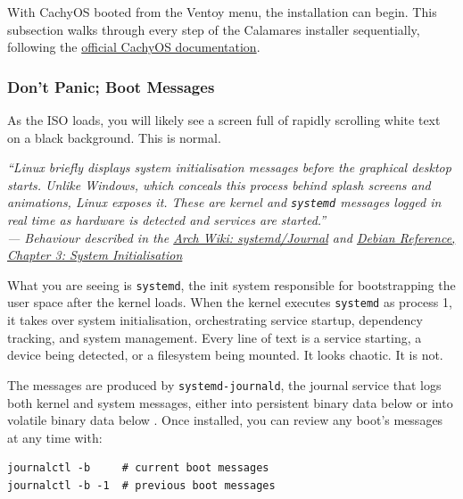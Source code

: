 \documentclass{article}
\newcommand{\code}[1]{\colorbox{codebg}{\texttt{#1}}}
\begin{document}
With CachyOS booted from the Ventoy menu, the installation can begin. This subsection walks through every step of the Calamares installer sequentially, following the
\href{https://wiki.cachyos.org}{official CachyOS documentation}.

\subsubsection{Don't Panic; Boot Messages}

As the ISO loads, you will likely see a screen full of rapidly scrolling white text on a black background. This is normal.  

\begin{mdframed}[linewidth=1.5pt, linecolor=black!50, topline=true, bottomline=true,
  leftline=false, rightline=false, backgroundcolor=black!3]
  \small\itshape
  ``Linux briefly displays system initialisation messages before the graphical desktop
  starts. Unlike Windows, which conceals this process behind splash screens and
  animations, Linux exposes it. These are kernel and \code{systemd} messages logged
  in real time as hardware is detected and services are started.''\\[4pt]
  \normalfont\small --- Behaviour described in the
  \href{https://wiki.archlinux.org/title/Systemd/Journal}{Arch Wiki: systemd/Journal}
  and \href{https://www.debian.org/doc/manuals/debian-reference/ch03.en.html}{Debian
  Reference, Chapter 3: System Initialisation}
\end{mdframed}

\noindent What you are seeing is \code{systemd}, the init system responsible for bootstrapping the user space after the kernel loads. When the kernel executes \code{systemd} as process 1, it takes over system initialisation,
orchestrating service startup, dependency tracking, and system management. Every line of text is a service starting, a device being detected, or a filesystem
being mounted. It looks chaotic. It is not.

The messages are produced by \code{systemd-journald}, the journal service that
logs both kernel and system messages, either into persistent binary
data below  or into volatile binary data below
. Once installed, you can review any boot's
messages at any time with: \begin{verbatim}
journalctl -b     # current boot messages
journalctl -b -1  # previous boot messages
\end{verbatim}
\end{document}

